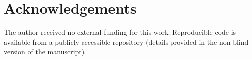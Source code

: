 \documentclass[final,3p,times]{elsarticle}
\begin{document}
\section*{Acknowledgements}

The author received no external funding for this work.
Reproducible code is available from a publicly accessible repository
(details provided in the non-blind version of the manuscript).



\end{document}
